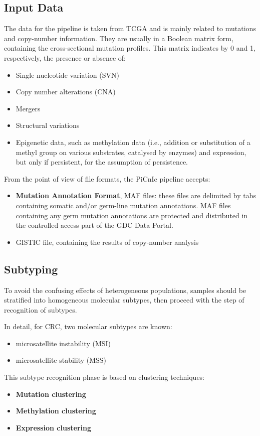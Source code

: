 \subsection{Input Data}
The data for the pipeline is taken from TCGA and is mainly related to mutations
and copy-number information. They are usually in a Boolean matrix form, containing
the cross-sectional mutation profiles. This matrix indicates by 0 and 1,
respectively, the presence or absence of:
\begin{itemize}
    \item Single nucleotide variation (SVN)
    \item Copy number alterations (CNA)
    \item Mergers
    \item Structural variations
    \item Epigenetic data, such as methylation data (i.e., addition or substitution
          of a methyl group on various substrates, catalysed by enzymes) and
          expression, but only if persistent, for the assumption of persistence.
\end{itemize}
From the point of view of file formats, the PiCnIc pipeline accepts:
\begin{itemize}
    \item \textbf{Mutation Annotation Format}, MAF files: these files are delimited
          by tabs containing somatic and/or germ-line mutation annotations. MAF
          files containing any germ mutation annotations are protected and distributed
          in the controlled access part of the GDC Data Portal.
    \item GISTIC file, containing the results of copy-number analysis
\end{itemize}
\subsection{Subtyping}
To avoid the confusing effects of heterogeneous populations, samples should be
stratified into homogeneous molecular subtypes, then proceed with the step of
recognition of subtypes.

In detail, for CRC, two molecular subtypes are known:
\begin{itemize}
    \item microsatellite instability (MSI)
    \item microsatellite stability (MSS)
\end{itemize}

This subtype recognition phase is based on clustering techniques:
\begin{itemize}
    \item \textbf{Mutation clustering}
    \item \textbf{Methylation clustering}
    \item \textbf{Expression clustering}
\end{itemize}
